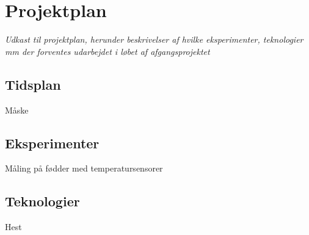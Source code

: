 \chapter{Projektplan}
\textit{Udkast til projektplan, herunder beskrivelser af hvilke eksperimenter, teknologier mm der forventes udarbejdet i løbet af afgangsprojektet}\\

\section{Tidsplan}
Måske

\section{Eksperimenter}
Måling på fødder med temperatursensorer

\section{Teknologier}
Hest
 